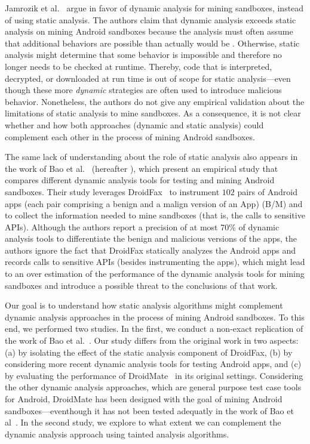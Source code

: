 Jamrozik et al.~\cite{DBLP:conf/icse/JamrozikSZ16} argue in favor of dynamic analysis for mining sandboxes, instead of using static analysis. The authors claim that dynamic analysis exceeds static analysis on mining Android sandboxes because the analysis must often assume that additional behaviors are possible than actually would be . Otherwise, static analysis might determine that some behavior is impossible and therefore no longer needs to be checked at runtime. Thereby, code that is interpreted, decrypted, or downloaded at run time is out of scope for static analysis---even though these more \emph{dynamic} strategies are often used to introduce malicious behavior. Nonetheless, the authors do not give any empirical validation about the limitations of static analysis to mine sandboxes. As a consequence, it is not clear whether and how both approaches (dynamic and static analysis) could complement each other in the process of mining Android sandboxes.

The same lack of understanding about the role of static analysis also appears in the work of Bao et al.~\cite{DBLP:conf/wcre/BaoLL18} (hereafter \blls), which present an empirical study that compares different dynamic analysis tools for testing and mining Android sandboxes. Their study leverages DroidFax~\cite{DBLP:conf/icsm/CaiR17a} to instrument $102$ pairs of Android apps (each pair comprising a benign and a malign version of an App) (B/M) and to collect the information needed to mine sandboxes (that is, the calls to sensitive APIs).
Although the authors report a precision of at most 70\% of dynamic analysis tools to differentiate the benign and malicious versions of the apps, the authors ignore the fact that DroidFax statically analyzes the Android apps and records calls to sensitive APIs (besides instrumenting the apps), which might lead to an over estimation of the performance of the dynamic analysis tools for mining sandboxes and introduce a possible threat to the conclusions of that work.

Our goal is to understand how static analysis
algorithms might complement dynamic analysis approaches in the process of mining Android sandboxes. To this end, we performed two studies. In the
first, we conduct a non-exact replication of the work of Bao et al.~\cite{DBLP:conf/wcre/BaoLL18}. Our study differs from the original work in two aspects: (a)
by isolating the effect of the static analysis component of DroidFax, (b) by considering more recent dynamic analysis tools for testing Android apps,
and (c) by evaluating the performance of DroidMate~\cite{DBLP:conf/icse/JamrozikZ16} in its original settings. Considering the other dynamic analysis approaches, which are
general purpose test case tools for Android, DroidMate has been designed with the goal of mining Android sandboxes---eventhough it has not been tested adequatly
in the work of Bao et al~\cite{DBLP:conf/wcre/BaoLL18}. In the second study, we explore to what extent we can complement the dynamic analysis approach using
tainted analysis algorithms.


